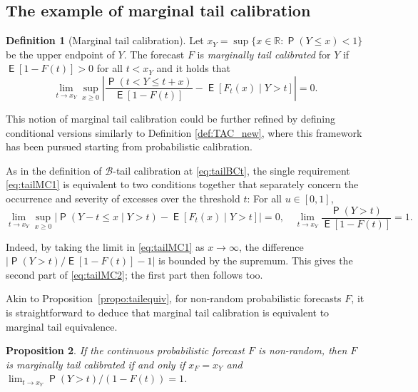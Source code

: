 \documentclass[12pt]{article}
\newcommand{\E}{\operatorname{\mathsf{E}}}
\newcommand{\Q}{\operatorname{\mathsf{P}}}
\newcommand{\R}{\mathbb{R}}
\newcommand{\Bb}{\mathcal{B}}
\newcommand{\1}{\mathbf{1}} %
\newtheorem{propo}{Proposition}
\theoremstyle{definition}
\newtheorem{defin}[propo]{Definition}
\begin{document}
\subsection{The example of marginal tail calibration}

\begin{defin}[Marginal tail calibration]
\label{defin:mtc}
Let $x_Y = \sup \{ x \in \R : \Q(Y \le x) < 1 \}$ be the upper endpoint of $Y$. The forecast $F$ is \emph{marginally tail calibrated} for $Y$ if $\E[1-F(t)] > 0$ for all $t < x_Y$ and it holds that
\begin{equation}\label{eq:tailMC1}
        \lim_{t \to x_Y} \sup_{x \ge 0} \left|
        \frac{\Q(t < Y \le t+x)}{\E[1-F(t)]}
        -
        \E[F_t(x) \mid Y > t]
    \right|
    = 0.
\end{equation}
\end{defin}

This notion of marginal tail calibration could be further refined by defining conditional versions similarly to Definition \ref{def:TAC_new}, where this framework has been pursued starting from probabilistic calibration.

As in the definition of $\Bb$-tail calibration at \eqref{eq:tailBCt}, the single requirement \eqref{eq:tailMC1} is equivalent to two conditions together that separately concern the occurrence and severity of excesses over the threshold $t$: For all $u \in [0,1]$,
\begin{equation}\label{eq:tailMC2}
    \lim_{t \to x_Y}
    \sup_{x \ge 0} \left|
        \Q(Y-t \le x \mid Y>t)
        - \E [F_t(x) \mid Y>t]
    \right| = 0, \quad \lim_{t \to x_Y} \frac{\Q(Y > t)}{\E[1-F(t)]} = 1.
\end{equation}

Indeed, by taking the limit in \eqref{eq:tailMC1} as $x \to \infty$, the difference $|\Q(Y > t)/\E[1-F(t)]-1|$ is bounded by the supremum. This gives the second part of \eqref{eq:tailMC2}; the first part then follows too.

Akin to Proposition~\ref{propo:tailequiv}, for non-random probabilistic forecasts $F$, it is straightforward to deduce that marginal tail calibration is equivalent to marginal tail equivalence.

\begin{propo}
	\label{propo:tailequiv_mtc}
	If the continuous probabilistic forecast $F$ is non-random, then $F$ is marginally tail calibrated if and only if $x_F = x_Y$ and $\lim_{t\to x_Y} \Q(Y > t)/(1-F(t)) = 1$.
\end{propo}
    
\end{document}
